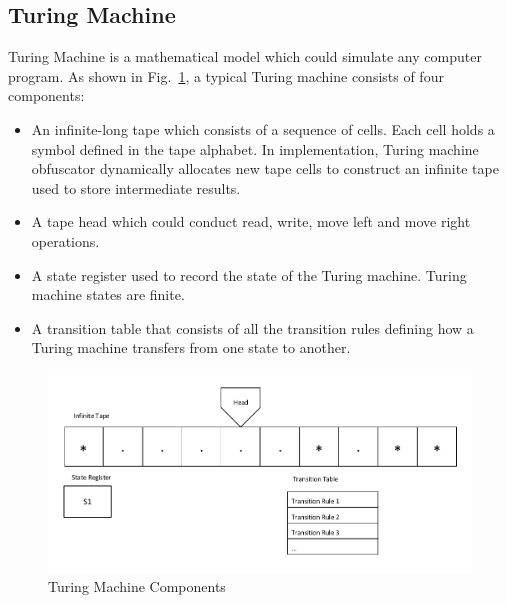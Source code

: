 \documentclass[lnicst]{svmultln}
\newcommand{\F}{Fig.}
\begin{document}
\subsection{Turing Machine}
Turing Machine is a mathematical model which could simulate any computer
program. As shown in \F~\ref{fig:three}, a typical Turing machine consists of
four components:
\begin{itemize}
  \item An infinite-long tape which consists of a sequence of cells. Each cell
    holds a symbol defined in the tape alphabet. In implementation,  Turing machine obfuscator dynamically allocates new
  tape cells to construct an infinite tape used to store intermediate results.
  \item A tape head which could conduct read, write, move left and move right
    operations.
  \item A state register used to record the state of the Turing machine. Turing
    machine states are finite.
  \item A transition table that consists of all the transition rules defining
    how a Turing machine transfers from one state to another.
\end{itemize}

\begin{figure}
 \includegraphics[width=0.9\linewidth]{TM.pdf}
 \caption{Turing Machine Components}
 \label{fig:three}
\end{figure}


\end{document}
